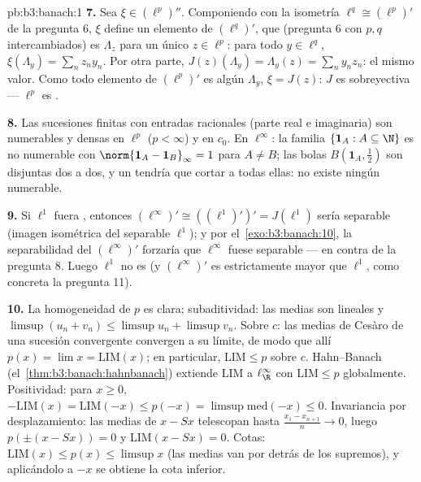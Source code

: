 \begin{solution}{pb:b3:banach:1}
\textbf{7.} Sea $\xi \in (\ell^p)''$. Componiendo con la isometría
$\ell^q \cong (\ell^p)'$ de la pregunta 6, $\xi$ define un elemento de
$(\ell^q)'$, que (pregunta 6 con $p, q$ intercambiados) es $\Lambda_z$
para un único $z \in \ell^p$: para todo $y \in \ell^q$,
$\xi(\Lambda_y) = \sum_nz_ny_n$. Por otra parte,
$J(z)(\Lambda_y) = \Lambda_y(z) = \sum_ny_nz_n$: el mismo valor. Como
todo elemento de $(\ell^p)'$ es algún $\Lambda_y$, $\xi = J(z)$: $J$ es
sobreyectiva --- $\ell^p$ es .

\textbf{8.} Las sucesiones finitas con entradas racionales (parte real e
imaginaria) son numerables y densas en $\ell^p$ ($p < \infty$) y en
$c_0$. En $\ell^\infty$: la familia $\{\mathbf 1_A : A
\subseteq \N\}$ es no numerable con $\norm{\mathbf 1_A -
\mathbf 1_B}_\infty = 1$ para $A \neq B$; las bolas $B(\mathbf
1_A, \frac12)$ son disjuntas dos a dos, y un
 tendría que cortar a
todas ellas: no existe ningún  numerable.

\textbf{9.} Si $\ell^1$ fuera ,
entonces $(\ell^\infty)'
\cong ((\ell^1)')' = J(\ell^1)$ sería separable (imagen isométrica del
separable $\ell^1$); y por el~\cref{exo:b3:banach:10}, la separabilidad
del  $(\ell^\infty)'$ forzaría que
$\ell^\infty$ fuese separable --- en contra de la pregunta 8. Luego
$\ell^1$ no es  (y
$(\ell^\infty)'$ es estrictamente mayor que $\ell^1$, como concreta la
pregunta 11).

\textbf{10.} La homogeneidad de $p$ es clara; subaditividad: las medias
son lineales y $\limsup(u_n + v_n) \leq \limsup u_n +
\limsup v_n$. Sobre $c$: las medias de Cesàro de una sucesión
convergente convergen a su límite, de modo que allí $p(x) = \lim x =
\mathrm{LIM}(x)$; en particular, $\mathrm{LIM} \leq p$ sobre $c$.
Hahn--Banach (el~\cref{thm:b3:banach:hahnbanach}) extiende
$\mathrm{LIM}$ a $\ell^\infty_\R$ con $\mathrm{LIM} \leq p$ globalmente.
Positividad: para $x \geq 0$, $-\mathrm{LIM}(x) =
\mathrm{LIM}(-x) \leq p(-x) = \limsup\text{med}(-x) \leq 0$. Invariancia
por desplazamiento: las medias de $x - Sx$ telescopan hasta
$\frac{x_1 - x_{n+1}}n \to 0$, luego $p(\pm(x - Sx)) = 0$ y
$\mathrm{LIM}(x - Sx) = 0$. Cotas: $\mathrm{LIM}(x) \leq p(x)
\leq \limsup x$ (las medias van por detrás de los supremos), y
aplicándolo a $-x$ se obtiene la cota inferior.


\end{solution}

